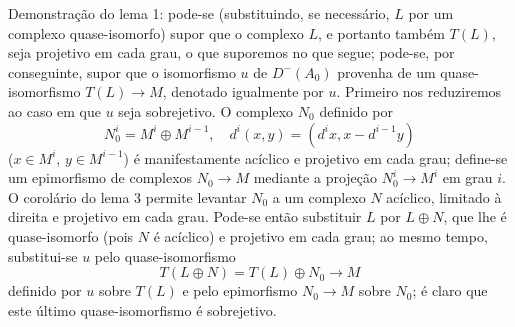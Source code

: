Demonstração do lema 1: pode-se (substituindo, se necessário, $L$ por um complexo quase-isomorfo) supor que o complexo $L$, e portanto também $T(L)$, seja projetivo em cada grau, o que suporemos no que segue; pode-se, por conseguinte, supor que o isomorfismo $u$ de $D^-(A_0)$ provenha de um quase-isomorfismo $T(L)\to M$, denotado igualmente por $u$. Primeiro nos reduziremos ao caso em que $u$ seja sobrejetivo. O complexo $N_0$ definido por
\[
N_0^i=M^i\oplus M^{i-1},
\quad
 d^i(x,y)=(d^i x,x-d^{i-1}y)
\]
($x\in M^i$, $y\in M^{i-1}$) é manifestamente acíclico e projetivo em cada grau; define-se um epimorfismo de complexos $N_0\to M$ mediante a projeção $N_0^i\to M^i$ em grau $i$. O corolário do lema 3 permite levantar $N_0$ a um complexo $N$ acíclico, limitado à direita e projetivo em cada grau. Pode-se então substituir $L$ por $L\oplus N$, que lhe é quase-isomorfo (pois $N$ é acíclico) e projetivo em cada grau; ao mesmo tempo, substitui-se $u$ pelo quase-isomorfismo
\[
T(L\oplus N)=T(L)\oplus N_0\longrightarrow M
\]
definido por $u$ sobre $T(L)$ e pelo epimorfismo $N_0\to M$ sobre $N_0$; é claro que este último quase-isomorfismo é sobrejetivo.
